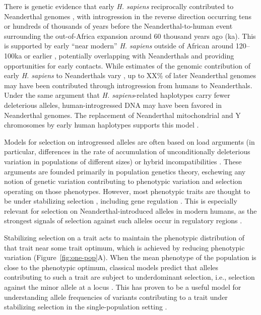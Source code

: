\documentclass{article}
\begin{document}
There is genetic evidence that early \emph{H. sapiens} reciprocally contributed
to Neanderthal genomes \citep{kuhlwilm2016ancient,hubisz2020mapping}, with
introgression in the reverse direction occurring tens or hundreds of thousands
of years before the Neanderthal-to-human event surrounding the out-of-Africa
expansion around 60 thousand years ago (ka). This is supported by early ``near
modern'' \emph{H.  sapiens} outside of African around 120--100ka or earlier
\citep{schwarcz1988esr,grun2005u,beyer2021climatic}, potentially overlapping
with Neanderthals and providing opportunities for early contacts. While
estimates of the genomic contribution of early \emph{H. sapiens} to
Neanderthals vary \citep{}, up to XX\% of later Neanderthal genomes may have
been contributed through introgression from humans to Neanderthals. Under the
same argument that \emph{H. sapiens}-related haplotypes carry fewer deleterious
alleles, human-introgressed DNA may have been favored in Neanderthal genomes.
The replacement of Neanderthal mitochondrial and Y chromosomes by early human
haplotypes supports this model \citep{posth2017deeply,petr2020evolutionary}.

Models for selection on introgressed alleles are often based on load arguments
(in particular, differences in the rate of accumulation of unconditionally
deleterious variation in populations of different sizes) or hybrid
incompatibilities \citep{mueller,etc}. These arguments are founded primarily in
population genetics theory, eschewing any notion of genetic variation
contributing to phenotypic variation and selection operating on those
phenotypes. However, most phenotypic traits are thought to be under stabilizing
selection \citep{sanjak2018evidence}, including gene regulation
\citep{gilad2006natural,hodgins2015gene,price2022detecting}. This is especially
relevant for selection on Neanderthal-introduced alleles in modern humans, as
the strongest signals of selection against such alleles occur in regulatory
regions \citep{sankararaman2014genomic}.

Stabilizing selection on a trait acts to maintain the phenotypic distribution
of that trait near some trait optimum, which is achieved by reducing phenotypic
variation (Figure~\ref{fig:one-pop}A). When the mean phenotype of the
population is close to the phenotypic optimum, classical models predict that
alleles contributing to such a trait are subject to underdominant selection,
i.e., selection against the minor allele at a locus
\citep{robertson1956effect}. This has proven to be a useful model for
understanding allele frequencies of variants contributing to a trait under
stabilizing selection in the single-population setting
\citep[e.g.,][]{keightley1988quantitative, simons2018population,
hayward2022polygenic}.
\end{document}
